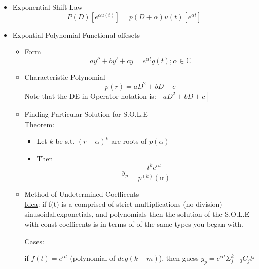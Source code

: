 \documentclass[11pt]{article}
\begin{document}
\begin{itemize}
\item Exponential Shift Law\\
\label{sec-9-2-5-3}%
\begin{equation}
     P(D)[e^{\alpha u(t)}]=p(D+\alpha)u(t)[e^{\alpha t}]
     \end{equation}

\item Expontial-Polynomial Functional offesets
\label{sec-9-2-5-4}%
\begin{itemize}

\item Form\\
\label{sec-9-2-5-4-1}%
\begin{equation}
      ay''+by'+cy=e^{\alpha t}g(t); \alpha\in\mathbb{C}
      \end{equation}

\item Characteristic Polynomial\\
\label{sec-9-2-5-4-2}%
\begin{equation}
      p(r)=aD^2+bD+c
      \end{equation}
      Note that the DE in Operator notation is: $[aD^2+bD+c]$

\item Finding Particular Solution for S.O.L.E\\
\label{sec-9-2-5-4-3}%
\underline{Theorem}:
\begin{itemize}
\item Let $k$ be s.t. $(r-\alpha)^k$ are roots of $p(\alpha)$
\item Then
        \begin{equation}
        y_p=\frac{t^ke^{\alpha t}}{p^{(k)}(\alpha)}
        \end{equation}
\end{itemize}

\item Method of Undetermined Coefficents\\
\label{sec-9-2-5-4-4}%
\underline{Idea}: if f(t) is a comprised of strict multiplications (no division) sinusoidal,exponetials, and
      polynomials then the solution of the S.O.L.E with const
      coefficents is in terms of of the same types you began with.

      \underline{Cases}:

      if $f(t)=e^{\alpha t}$ (polynomial of $deg(k+m)$), then guess
      $y_p=e^{\alpha t}\Sigma_{j=0}^k C_jt^j$
\end{itemize} %


\end{itemize}
\end{document}
